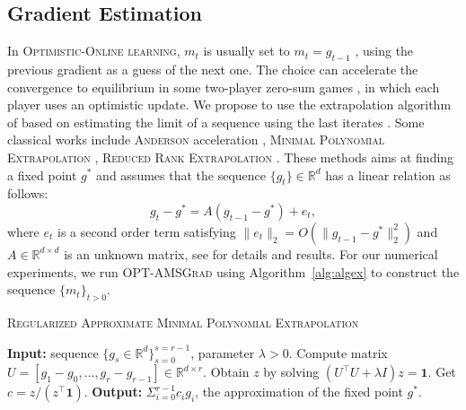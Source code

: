 \documentclass[11pt]{article}
\theoremstyle{k}
\begin{document}
\subsection{Gradient Estimation}
In \textsc{Optimistic-Online learning}, $m_{t}$ is usually set to $m_{t}= g_{t-1}$ \citep{CJ12}, \ie using the previous gradient as a guess of the next one.
The choice can accelerate the convergence to equilibrium in some two-player zero-sum games \citep{rakhlin2013online,SALS15,DISZ18}, in which each player uses an optimistic update.
We propose to use the extrapolation algorithm of \citep{SAB16} based on estimating the limit of a sequence using the last iterates \citep{BZ13}. 
Some classical works include \textsc{Anderson} acceleration \citep{WN11}, \textsc{Minimal Polynomial Extrapolation} \citep{CJ76},  \textsc{Reduced Rank Extrapolation} \citep{E79}.
These methods aims at finding a fixed point $g^{*}$ and assumes that the sequence $\{g_t\} \in \mathbb R^d$ has a linear relation as follows:
\begin{equation} \label{nox}
g_t - g^* = A( g_{t-1} - g^* ) + e_t,
\end{equation}
where $e_t$ is a second order term satisfying $\| e_t \|_2  = O( \| g_{t-1} - g^* \|_2^2)$ and $A \in \mathbb R^{d \times d}$ is an unknown matrix, see \citep{SAB16} for details and results.
For our numerical experiments, we run \textsc{OPT-AMSGrad} using Algorithm~\ref{alg:algex} to construct the sequence $\{m_t\}_{t>0}$. 
\begin{algorithm}[h]
\begin{algorithmic}[1] 
\small
\caption{\textsc{Regularized Approximate Minimal Polynomial Extrapolation}
\citep{SAB16} } \label{alg:algex}
\STATE \textbf{Input:} sequence $\{ g_s \in \mathbb R^d \}_{s=0}^{s=r-1}$, parameter $\lambda > 0$.
\STATE Compute matrix  $U = [ g_1 - g_0, \dots, g_{r} - g_{r-1}] \in \mathbb R^{d \times r}$.
\STATE Obtain $z$ by solving $(U^\top U + \lambda I ) z = \mathbf{1}$.
\STATE Get $c= z / (z^\top \mathbf{1})$.
\STATE \textbf{Output:} $\Sigma_{i=0}^{r-1} c_i g_i$, the approximation of the fixed point $g^*$.
\end{algorithmic}
\end{algorithm}
\end{document}
